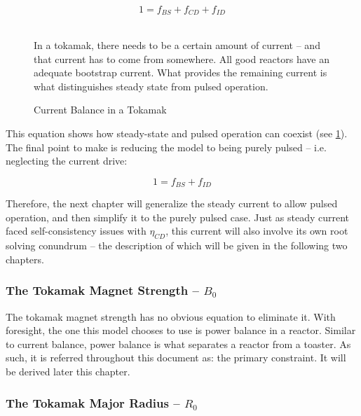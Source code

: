 \begin{equation}
	1 = f_{BS} + f_{CD} + f_{ID}
\end{equation}

\begin{figure}
	\centering
	\begin{adjustbox}{width=0.75\textwidth}
		
	\end{adjustbox}
	\caption{Current Balance in a Tokamak} ~\\
	\small In a tokamak, there needs to be a certain amount of current -- and that current has to come from somewhere. All good reactors have an adequate bootstrap current. What provides the remaining current is what distinguishes steady state from pulsed operation.
	\label{fig:curbal}
\end{figure}

This equation shows how steady-state and pulsed operation can coexist (see \cref{fig:curbal}). The final point to make is reducing the model to being purely pulsed -- i.e. neglecting the current drive:

\begin{equation}
	1 = f_{BS} + f_{ID}
\end{equation}

Therefore, the next chapter will generalize the steady current to allow pulsed operation, and then simplify it to the purely pulsed case. Just as steady current faced self-consistency issues with $\eta_{CD}$, this current will also involve its own root solving conundrum -- the description of which will be given in the following two chapters.

\subsubsection{The Tokamak Magnet Strength -- $B_0$}

The tokamak magnet strength has no obvious equation to eliminate it. With foresight, the one this model chooses to use is power balance in a reactor. Similar to current balance, power balance is what separates a reactor from a toaster. As such, it is referred throughout this document as: the primary constraint. It will be derived later this chapter.

\subsubsection{The Tokamak Major Radius -- $R_0$}

